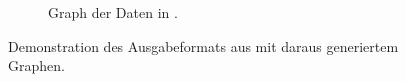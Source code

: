\begin{figure}[ht]
\begin{subfigure}[c]{0.49\textwidth}
        \caption{
            Graph der Daten in .\label{subfig:funkterm-beispielgraph}
        }
    \end{subfigure}
    \caption{Demonstration des Ausgabeformats aus  mit daraus generiertem Graphen.\label{fig:function-determination-raw-data}}
\end{figure}